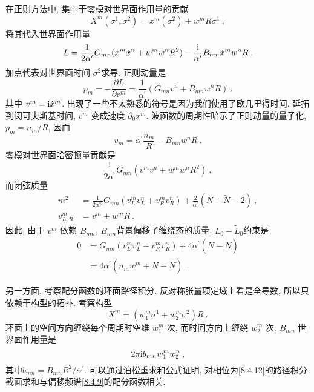 在正则方法中, 集中于零模对世界面作用量的贡献
\begin{equation}
	X^{m}(\sigma^{1}, \sigma^{2})=x^{m}(\sigma^{2})+w^{m} R \sigma^{1} \:, \label{8.4.4}
\end{equation}
将其代入世界面作用量
\begin{equation}
	L=\frac{1}{2 \alpha^{\prime}} G_{m n}(\dot{x}^{m} \dot{x}^{n}+w^{m} w^{n} R^{2})
	-\frac{\mathrm{i}}{\alpha^{\prime}} B_{m n} \dot{x}^{m} w^{n} R \:. \label{8.4.5}
\end{equation}
加点代表对世界面时间 $\sigma^{2}$求导. 正则动量是
\begin{equation}
	p_{m}=-\frac{\partial L}{\partial v^{m}}=\frac{1}{\alpha^{\prime}}(G_{m n} v^{n}+B_{m n} w^{n} R) \:. \label{8.4.6}
\end{equation}
其中 $v^{m}=\mathrm{i} \dot{x}^{m} $. 出现了一些不太熟悉的符号是因为我们使用了欧几里得时间. 延拓到闵可夫斯基时间, $v^{m}$ 变成速度 $\partial_{0} x^{m} $. 
波函数的周期性暗示了正则动量的量子化, $p_{m}=n_{m} / R$, 因而
\begin{equation}
	v_{m}=\alpha^{\prime} \frac{n_{m}}{R}-B_{m n} w^{n} R \:. \label{8.4.7}
\end{equation}
零模对世界面哈密顿量贡献是
\begin{equation}
	\frac{1}{2 \alpha^{\prime}} G_{m n}(v^{m} v^{n}+w^{m} w^{n} R^{2}) \:, \label{8.4.8}
\end{equation}
而闭弦质量
\begin{subequations} \label{8.4.9}
\begin{align}
		m^{2} &= \frac{1}{2 \alpha^{\prime 2}} G_{m n}(v_{L}^{m} v_{L}^{n}+v_{R}^{m} v_{R}^{n})
		+\frac{2}{\alpha^{\prime}}(N+\tilde{N}-2)  \:, \label{8.4.9a} \\
		v_{L, R}^{m} &= v^{m} \pm w^{m} R \:. \label{8.4.9b}
\end{align}
\end{subequations}
因此, 由于 $v^{m}$ 依赖 $B_{m n}$,  $B_{m n}$背景偏移了缠绕态的质量.  $L_{0}-\tilde{L}_{0}$约束是
\begin{align}
	0 &=G_{m n}(v_{L}^{m} v_{L}^{n}-v_{R}^{m} v_{R}^{n})+4 \alpha^{\prime}(N-\tilde{N}) \nonumber \\
	&=4 \alpha^{\prime}(n_{m} w^{m}+N-\tilde{N}) \:. \label{8.4.10}
\end{align}

另一方面, 考察配分函数的环面路径积分. 反对称张量项定域上看是全导数, 所以只依赖于构型的拓扑. 考察构型
\begin{equation}
	X^{m}=(w_{1}^{m} \sigma^{1}+w_{2}^{m} \sigma^{2}) R \:. \label{8.4.11}
\end{equation}
环面上的空间方向缠绕每个周期时空维 $w_{1}^{m}$ 次, 而时间方向上缠绕 $w_{2}^{m}$ 次.  $B_{m n}$ 世界面作用量是
\begin{equation}
	2 \pi \mathrm{i} b_{m n} w_{1}^{m} w_{2}^{n} \:, \label{8.4.12}
\end{equation}
其中$b_{m n}=B_{m n} R^{2} / \alpha^{\prime}$. 可以通过泊松重求和公式证明, 
对相位为\eqref{8.4.12}的路径积分截面求和与偏移频谱\eqref{8.4.9}的配分函数相关.

